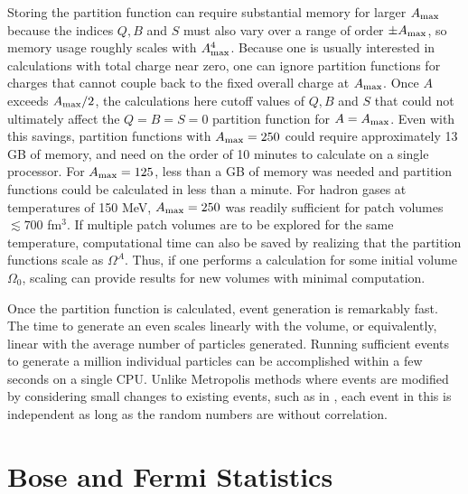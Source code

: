 \documentclass[aps,prc,nofootinbib,showpacs,superscriptaddress,groupedaddress]{revtex4-1}
\begin{document}
Storing the partition function can require substantial memory for larger $A_{\rm max}$ because the indices $Q,B$ and $S$ must also vary over a range of order $\pm A_{\rm max}$, so memory usage roughly scales with $A_{\rm max}^4$. Because one is usually interested in calculations with total charge near zero, one can ignore partition functions for charges that cannot couple back to the fixed overall charge at $A_{\rm max}$. Once $A$ exceeds $A_{\rm max}/2$, the calculations here cutoff values of $Q,B$ and $S$ that could not ultimately affect the $Q=B=S=0$ partition function for $A=A_{\rm max}$. Even with this savings, partition functions with $A_{\rm max}=250$ could require approximately 13 GB of memory, and need on the order of 10 minutes to calculate on a single processor. For $A_{\rm max}=125$, less than a GB of memory was needed and partition functions could be calculated in less than a minute. For hadron gases at temperatures of 150 MeV, $A_{\rm max}=250$ was readily sufficient for patch volumes $\lesssim 700$ fm$^3$. If multiple patch volumes are to be explored for the same temperature, computational time can also be saved by realizing that the partition functions scale as $\Omega^A$. Thus, if one performs a calculation for some initial volume $\Omega_0$, scaling can provide results for new volumes with minimal computation.

Once the partition function is calculated, event generation is remarkably fast. The time to generate an even scales linearly with the volume, or equivalently, linear with the average number of particles generated. Running sufficient events to generate a million individual particles can be accomplished within a few seconds on a single CPU. Unlike Metropolis methods where events are modified by considering small changes to existing events, such as in \cite{}, each event in this is independent as long as the random numbers are without correlation.

\section{Bose and Fermi Statistics}\label{sec:theorybosefermi}
\end{document}
